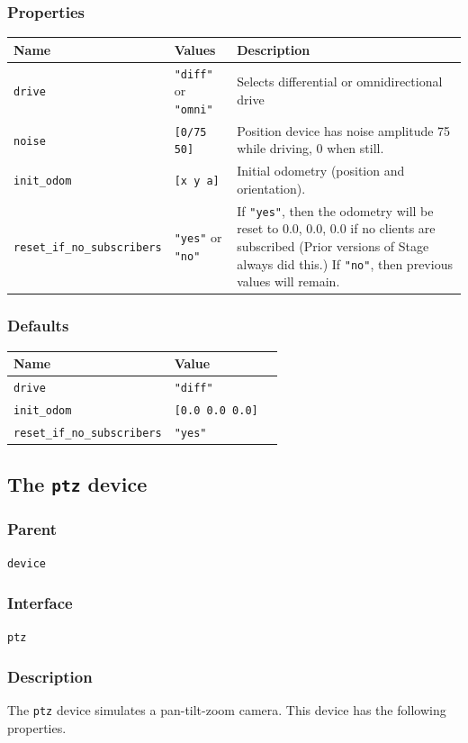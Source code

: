 \documentclass[11pt,twoside]{report}
\begin{document}
\subsubsection*{Properties}
\begin{tabularx}{\columnwidth}{llX}
\hline
Name & Values & Description \\
\hline
\verb'drive' & \verb'"diff"' or \verb'"omni"' & Selects differential or omnidirectional drive\\
\verb'noise' & \verb'[0/75 50]' & Position device has noise amplitude 75 while driving, 0 when still.\\
\verb'init_odom' & \verb'[x y a]' & Initial odometry (position and 
orientation).\\
\verb'reset_if_no_subscribers' & \verb'"yes"' or \verb'"no"' & If \verb'"yes"', 
then the odometry will be reset to 0.0, 0.0, 0.0 if no clients are subscribed
(Prior versions of Stage always did this.)
If \verb'"no"', then previous values will remain.\\
\hline
\end{tabularx}

\subsubsection*{Defaults}
\begin{tabularx}{\columnwidth}{llX}
\hline Name & Value\\ 
\hline
\verb'drive' & \verb'"diff"'\\
\verb'init_odom' & \verb'[0.0 0.0 0.0]'\\
\verb'reset_if_no_subscribers' & \verb'"yes"'\\
\hline
\end{tabularx}

\newpage
\subsection{The {\tt ptz} device}

\subsubsection*{Parent}
{\tt device}

\subsubsection*{Interface}
{\tt ptz}

\subsubsection*{Description}
The {\tt ptz} device simulates a pan-tilt-zoom camera.
This device has the following properties.
\end{document}
